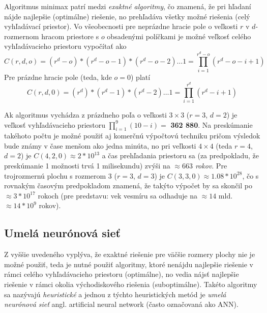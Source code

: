 
Algoritmus minimax patrí medzi \emph{exaktné algoritmy}, čo znamená, že pri hľadaní nájde najlepšie (optimálne)
riešenie, no prehľadáva všetky možné riešenia (celý vyhľadávací priestor).
Vo všeobecnosti pre neprázdne hracie pole o veľkosti $r$ v $d$-rozmernom hracom priestore s $o$ obsadenými políčkami je
možné veľkosť celého vyhľadávacieho priestoru vypočítať ako
\begin{equation}
    C(r, d, o) = (r^d - o) * (r^d - o - 1) * (r^d - o - 2) \dots 1 = \prod_{i = 1}^{r^d - o}{(r^d - o - i + 1)}
\end{equation}
Pre prázdne hracie pole (teda, kde $o = 0$) platí
\begin{equation}
    C(r, d, 0) = (r^d) * (r^d - 1) * (r^d - 2) \dots 1 = \prod_{i = 1}^{r^d}{(r^d - i + 1)}
\end{equation}

Ak algoritmus vychádza z prázdneho poľa o veľkosti $3 \times 3$ ($r = 3$, $d = 2$) je veľkosť vyhľadávacieho priestoru
$\prod_{i = 1}^{9}{(10 - i)} =$ \textbf{362 880}.
Na preskúmanie takéhoto počtu je možné použiť aj komerčnú výpočtovú techniku pričom výsledok bude známy v čase menšom
ako jedna minúta, no pri veľkosti $4 \times 4$ (teda $r = 4$, $d = 2$) je $C(4, 2, 0) \approx 2*10^{13}$ a čas
prehľadania priestoru sa (za predpokladu, že preskúmanie 1 možnosti trvá 1 milisekundu) zvýši na
\emph{$\approx 663$ rokov}.
Pre trojrozmernú plochu s rozmerom $3$ ($r = 3$, $d = 3$) je $C(3, 3, 0) \approx 1.08 * 10^{28}$, čo s rovnakým časovým
predpokladom znamená, že takýto výpočet by sa skončil po $\approx 3*10^{17}$ rokoch (pre predstavu: vek vesmíru sa
odhaduje na $\approx 14$ mld. $\approx 14 * 10^9$ rokov).

\subsection{Umelá neurónová sieť}\label{subsec:algo-ann}

Z vyššie uvedeného vyplýva, že exaktné riešenie pre väčšie rozmery plochy nie je možné použiť, teda je nutné použiť
algoritmy, ktoré nenájdu najlepšie riešenie v rámci celého vyhľadávacieho priestoru (optimálne), no vedia nájsť
najlepšie riešenie v rámci okolia východiskového riešenia (suboptimálne).
Takéto algoritmy sa nazývajú \emph{heuristické} a jednou z týchto heuristických metód je \emph{umelá neurónová sieť}
angl. artificial neural network (často označovaná ako ANN).

